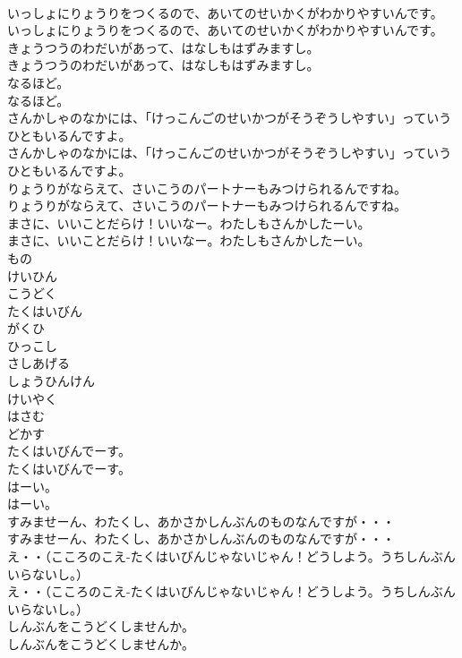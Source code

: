 \documentclass[8pt]{extreport}
\begin{document}
\begin{CJK}{UTF8}{min}
\\	いっしょにりょうりをつくるので、あいてのせいかくがわかりやすいんです。	
\\	いっしょにりょうりをつくるので、あいてのせいかくがわかりやすいんです。 
\\	きょうつうのわだいがあって、はなしもはずみますし。	
\\	きょうつうのわだいがあって、はなしもはずみますし。 
\\	なるほど。	
\\	なるほど。 
\\	さんかしゃのなかには、「けっこんごのせいかつがそうぞうしやすい」っていうひともいるんですよ。	
\\	さんかしゃのなかには、「けっこんごのせいかつがそうぞうしやすい」っていうひともいるんですよ。 
\\	りょうりがならえて、さいこうのパートナーもみつけられるんですね。	
\\	りょうりがならえて、さいこうのパートナーもみつけられるんですね。 
\\	まさに、いいことだらけ！いいなー。わたしもさんかしたーい。	
\\	まさに、いいことだらけ！いいなー。わたしもさんかしたーい。 
\\	もの
\\	けいひん
\\	こうどく
\\	たくはいびん
\\	がくひ
\\	ひっこし
\\	さしあげる
\\	しょうひんけん
\\	けいやく
\\	はさむ
\\	どかす
\\	たくはいびんでーす。	
\\	たくはいびんでーす。 
\\	はーい。	
\\	はーい。 
\\	すみませーん、わたくし、あかさかしんぶんのものなんですが・・・	
\\	すみませーん、わたくし、あかさかしんぶんのものなんですが・・・ 
\\	え・・（こころのこえ-たくはいびんじゃないじゃん！どうしよう。うちしんぶんいらないし。）	
\\	え・・（こころのこえ-たくはいびんじゃないじゃん！どうしよう。うちしんぶんいらないし。） 
\\	しんぶんをこうどくしませんか。	
\\	しんぶんをこうどくしませんか。 

\end{CJK}
\end{document}
